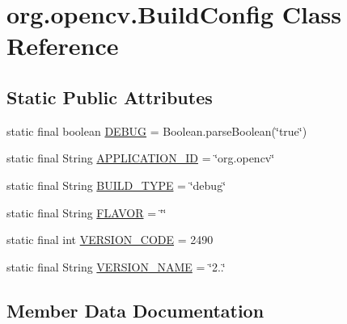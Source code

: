\hypertarget{classorg_1_1opencv_1_1_build_config}{}\section{org.\+opencv.\+Build\+Config Class Reference}
\label{classorg_1_1opencv_1_1_build_config}
\subsection*{Static Public Attributes}
\begin{DoxyCompactItemize}
\item 
static final boolean \mbox{\hyperlink{classorg_1_1opencv_1_1_build_config_a2abec1452b2bbec59eb224bb089191c5}{D\+E\+B\+UG}} = Boolean.\+parse\+Boolean(\char`\"{}true\char`\"{})
\item 
static final String \mbox{\hyperlink{classorg_1_1opencv_1_1_build_config_abcac1e68679557df4554ddcd99fa8517}{A\+P\+P\+L\+I\+C\+A\+T\+I\+O\+N\+\_\+\+ID}} = \char`\"{}org.\+opencv\char`\"{}
\item 
static final String \mbox{\hyperlink{classorg_1_1opencv_1_1_build_config_acc9c4c4654a20a7d9d34de583d918e0c}{B\+U\+I\+L\+D\+\_\+\+T\+Y\+PE}} = \char`\"{}debug\char`\"{}
\item 
static final String \mbox{\hyperlink{classorg_1_1opencv_1_1_build_config_ae4d147950e0eaf81138b6ece00f98553}{F\+L\+A\+V\+OR}} = \char`\"{}\char`\"{}
\item 
static final int \mbox{\hyperlink{classorg_1_1opencv_1_1_build_config_a0ecc7c2d7f0d344b2b400a64a7ce5ca8}{V\+E\+R\+S\+I\+O\+N\+\_\+\+C\+O\+DE}} = 2490
\item 
static final String \mbox{\hyperlink{classorg_1_1opencv_1_1_build_config_a8e45768b3190acf5360ac2f724ddcfaa}{V\+E\+R\+S\+I\+O\+N\+\_\+\+N\+A\+ME}} = \char`\"{}2..\char`\"{}
\end{DoxyCompactItemize}


\subsection{Member Data Documentation}
\mbox{\label{classorg_1_1opencv_1_1_build_config_abcac1e68679557df4554ddcd99fa8517}} 
